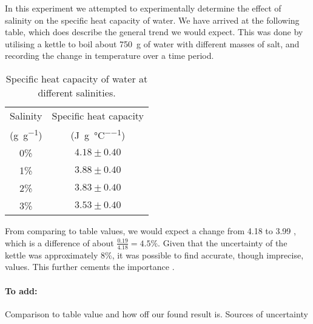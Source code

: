In this experiment we attempted to experimentally determine the effect of salinity on the specific heat capacity of water. We have arrived at the following table, which does describe the general trend we would expect. This was done by utilising a kettle to boil about \SI{750}{\gram} of water with different masses of salt, and recording the change in temperature over a time period.
\begin{table}[h] \centering
	\begin{tabular}{cc} 
		Salinity & Specific heat capacity \\
		(\si{\gram\per\gram}) & (\si{\joule\per\gram\per\celsius}) \\ \hline
		0\%	& $4.18\pm 0.40$\\
		1\%	& $3.88\pm 0.40$\\
		2\%	& $3.83\pm 0.40$\\
		3\% & $3.53\pm 0.40$\\
	\end{tabular}
	\caption{Specific heat capacity of water at different salinities.}
\end{table}

From comparing to table values, we would expect a change from 4.18 to 3.99 \citep{KayeLaby2005TableOfContents}, which is a difference of about $ \frac{0.19}{4.18} = 4.5\% $. Given that the uncertainty of the kettle was approximately 8\%, it was possible to find accurate, though imprecise, values. This further cements the importance . 
\paragraph{To add:} Comparison to table value and how off our found result is. Sources of uncertainty